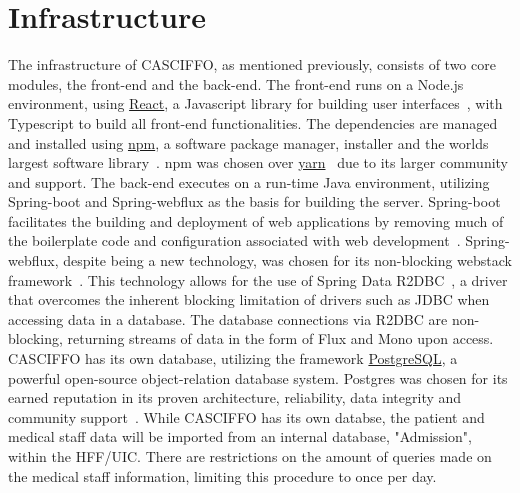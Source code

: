 \section{Infrastructure}
\label{sec:infrastructure}
The infrastructure of CASCIFFO, as mentioned previously, consists of two core modules, the front-end and the back-end.  
The front-end runs on a Node.js environment, using \href{https://reactjs.org/}{React}, a Javascript library for building user interfaces~\cite{reactjs},  with Typescript to build all front-end functionalities. The dependencies are managed and installed using \href{https://docs.npmjs.com/about-npm}{npm}, a software package manager, installer and the worlds largest software library~\cite{npm}. npm was chosen over \href{https://yarnpkg.com/}{yarn}~\cite{yarn} due to its larger community and support.
The back-end executes on a run-time Java environment, utilizing Spring-boot and Spring-webflux as the basis for building the server. Spring-boot facilitates the building and deployment of web applications by removing much of the boilerplate code and configuration associated with web development~\cite{spring-boot}. Spring-webflux, despite being a new technology, was chosen for its non-blocking webstack framework~\cite{spring-webflux}. This technology allows for the use of Spring Data R2DBC~\cite{r2dbc}, a driver that overcomes the inherent blocking limitation of drivers such as JDBC when accessing data in a database. The database connections via R2DBC are non-blocking, returning streams of data in the form of Flux and Mono upon access.
CASCIFFO has its own database, utilizing the framework \href{https://www.postgresql.org/about/}{PostgreSQL}, a powerful open-source object-relation database system. Postgres was chosen for its earned reputation in its proven architecture, reliability, data integrity and community support~\cite{postgresql}. While CASCIFFO has its own databse, the patient and medical staff data will be imported from an internal database, "Admission", within the HFF/UIC. There are restrictions on the amount of queries made on the medical staff information, limiting this procedure to once per day.

